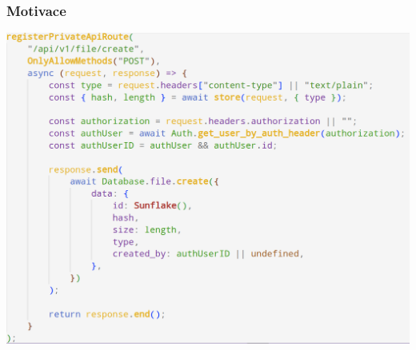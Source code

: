 \begin{frame}
  \frametitle{Motivace}
  \begin{center}
    \includegraphics[width=\textwidth]{img/01-scary-screenshot-4.png}
  \end{center}
\end{frame}







